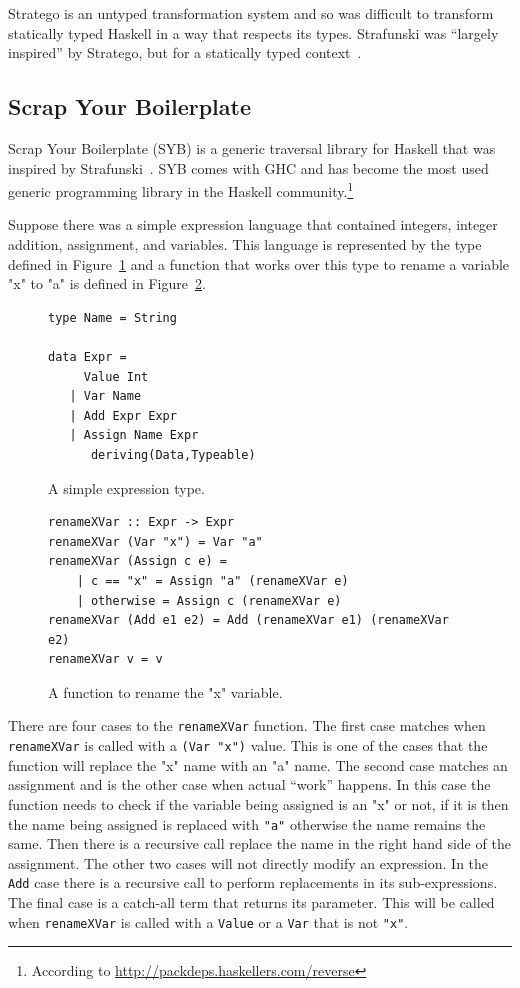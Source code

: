 Stratego is an untyped transformation system and so was difficult to transform statically typed Haskell in a way that respects its types. Strafunski was ``largely inspired'' by Stratego, but for a statically typed context~\citep{strafunski}.
  
\subsection{Scrap Your Boilerplate}\label{syb}

	Scrap Your Boilerplate (SYB) is a generic traversal library for Haskell that was inspired by Strafunski~\citep{syb}. SYB comes with GHC and has become the most used generic programming library in the Haskell community.\footnote{According to \url{http://packdeps.haskellers.com/reverse}} 

	Suppose there was a simple expression language that contained integers, integer addition, assignment, and variables. This language is represented by the type defined in Figure~\ref{expression} and a function that works over this type to rename a variable "x" to "a" is defined in Figure~\ref{renamexvar}.
	
	\begin{figure}[t]
	\begin{lstlisting}
type Name = String

data Expr =
     Value Int
   | Var Name
   | Add Expr Expr
   | Assign Name Expr
      deriving(Data,Typeable)
	\end{lstlisting}
	\caption{A simple expression type.}
	\label{expression}
	\end{figure}
	
	\begin{figure}[t]
	\begin{lstlisting}
renameXVar :: Expr -> Expr
renameXVar (Var "x") = Var "a"
renameXVar (Assign c e) = 
	| c == "x" = Assign "a" (renameXVar e)
	| otherwise = Assign c (renameXVar e)
renameXVar (Add e1 e2) = Add (renameXVar e1) (renameXVar e2)
renameXVar v = v
	\end{lstlisting}
	\caption{A function to rename the "x" variable.}
	\label{renamexvar}
	\end{figure}
	
	There are four cases to the \texttt{renameXVar} function. The first case matches when \texttt{renameXVar} is called with a \texttt{(Var "x")} value. This is one of the cases that the function will replace the "x" name with an "a" name. The second case matches an assignment and is the other case when actual ``work'' happens. In this case the function needs to check if the variable being assigned is an "x" or not, if it is then the name being assigned is replaced with \texttt{"a"} otherwise the name remains the same. Then there is a recursive call replace the name in the right hand side of the assignment. The other two cases will not directly modify an expression. In the \texttt{Add} case there is a recursive call to perform replacements in its sub-expressions. The final case is a catch-all term that returns its parameter. This will be called when \texttt{renameXVar} is called with a \texttt{Value} or a \texttt{Var} that is not \texttt{"x"}.
	
